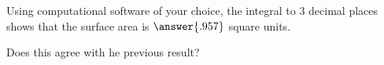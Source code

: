 \documentclass{ximera}
\begin{document}
\begin{exercise}
\begin{exercise}
\begin{exercise}
Using computational software of your choice, the integral to 3 decimal places shows that the surface area is $\answer{.957}$ square units.  

Does this agree with he previous result?

\begin{multipleChoice}
\end{multipleChoice}

\end{exercise}


\end{exercise}
\end{exercise}
\end{document}

